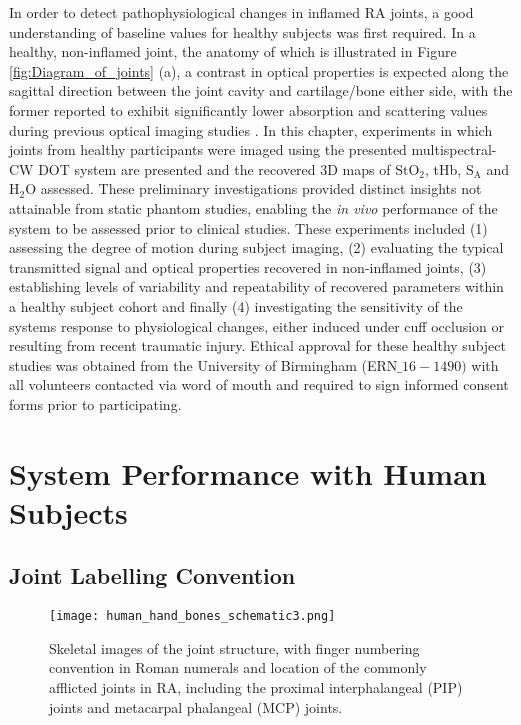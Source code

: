 \documentclass[twoside]{bhamthesis}
\theoremstyle{definition}
\begin{document}
In order to detect pathophysiological changes in inflamed RA joints, a good understanding of baseline values for healthy subjects was first required. In a healthy, non-inflamed joint, the anatomy of which is illustrated in Figure \ref{fig:Diagram_of_joints} (a), a contrast in optical properties is expected along the sagittal direction between the joint cavity and cartilage/bone either side, with the former reported to exhibit significantly lower absorption and scattering values during previous optical imaging studies \cite{montejo2013computer,yuan2007three}. In this chapter, experiments in which joints from healthy participants were imaged using the presented multispectral-CW DOT system are presented and the recovered 3D maps of $\mathrm{StO_2}$, tHb, $\mathrm{S_A}$ and $\mathrm{H_2O}$ assessed. These preliminary investigations provided distinct insights not attainable from static phantom studies, enabling the \textit{in vivo} performance of the system to be assessed prior to clinical studies. These experiments included (1) assessing the degree of motion during subject imaging, (2) evaluating the typical transmitted signal and optical properties recovered in non-inflamed joints, (3) establishing levels of variability and repeatability of recovered parameters within a healthy subject cohort and finally (4) investigating the sensitivity of the systems response to physiological changes, either induced under cuff occlusion or resulting from recent traumatic injury. Ethical approval for these healthy subject studies was obtained from the University of Birmingham (ERN$\_16-1490)$ with all volunteers contacted via word of mouth and required to sign informed consent forms prior to participating.

\section{System Performance with Human Subjects}

\subsection{Joint Labelling Convention}

\begin{figure}[!ht]
\centering\texttt{[image: human\_hand\_bones\_schematic3.png]}
\caption{Skeletal images of the joint structure, with finger numbering convention in Roman numerals and location of the commonly afflicted joints in RA, including the proximal interphalangeal (PIP) joints and metacarpal phalangeal (MCP) joints.}
\label{Joint_labelling_convention}
\end{figure}
\end{document}
